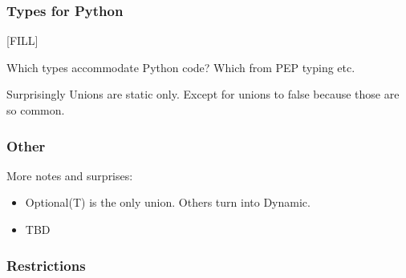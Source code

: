 \documentclass[english,cleveref,submission]{programming}
\begin{document}
\subsubsection{Types for Python}

[FILL]

Which types accommodate Python code? Which from PEP typing etc.

Surprisingly Unions are static only.
Except for unions to false because those are so common.


\subsubsection{Other}

More notes and surprises:

\begin{itemize}
  \item
    Optional(T) is the only union. Others turn into Dynamic.
  \item
    TBD
\end{itemize}


\subsubsection{Restrictions}
\end{document}
